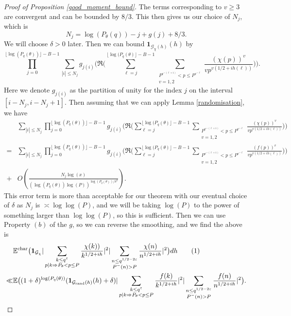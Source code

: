 \documentclass[10pt,a4paper]{amsart}
\numberwithin{equation}{section}
\newcommand\numberthis{\addtocounter{equation}{1}\tag{\theequation}}
\begin{document}
\begin{proof}[Proof of Proposition \ref{good_moment_bound}]
The terms corresponding to $v \geq 3$ are convergent and can be bounded by $8/3$. This then gives us our choice of $N_j$, which is
$$N_j = \log(P_\theta(q))-j+g(j)+8/3.$$
We will choose $\delta>0$ later. Then we can bound $\mathbf{1}_{\mathcal{G}_\chi(h)}(h)$ by
$$\prod_{j=0}^{\lfloor\log(P_q(\theta))\rfloor-B-1}\sum_{|i| \leq N_j}g_{j(i)}\big(\Re\big(\sum_{\ell=j}^{\lfloor\log(P_q(\theta)\rfloor - B -1}\sum_{\substack{P^{e^{-(\ell+1)}} < p \leq P^{e^{-\ell}} \\ v=1,2}}\frac{(\chi(p))^v}{vp^{v(1/2+ih(\ell))}}\big)\big).$$
Here we denote $g_{j(i)}$ as the partition of unity for the index $j$ on the interval $[i-N_j,i-N_j+1]$. Then assuming that we can apply Lemma \ref{randomisation}, we have
\begin{align*}
    &\sum_{|i| \leq N_j}\prod_{j=0}^{\lfloor\log(P_q(\theta))\rfloor-B-1}g_{j(i)}\big(\Re\big(\sum_{\ell=j}^{\lfloor\log(P_q(\theta)\rfloor - B -1}\sum_{\substack{P^{e^{-(\ell+1)}} < p \leq P^{e^{-\ell}} \\ v=1,2}}\frac{(\chi(p))^v}{vp^{v(1/2+ih(\ell))}}\big)\big) \\
    =& \sum_{|i| \leq N_j}\prod_{j=0}^{\lfloor\log(P_q(\theta))\rfloor-B-1}g_{j(i)}\big(\Re\big(\sum_{\ell=j}^{\lfloor\log(P_q(\theta)\rfloor - B -1}\sum_{\substack{P^{e^{-(\ell+1)}} < p \leq P^{e^{-\ell}} \\ v=1,2}}\frac{(f(p))^v}{vp^{v(1/2+ih(\ell))}}\big)\big)\\+&O(\frac{N_j\log(x)}{(\log(P_q(\theta))\log(P))^{\log(P_q(\theta))/\delta^2}}).
\end{align*}
This error term is more than acceptable for our theorem with our eventual choice of $\delta$ as $N_j$ is $\asymp \log\log(P)$, and we will be taking $\log(P)$ to the power of something larger than $\log\log(P)$, so this is sufficient. Then we can use Property $(b)$ of the $g$, so we can reverse the smoothing, and we find the above is
\begin{align*}
    &\mathbb{E}^{\text{char}}\big(\mathbf{1}_{\mathcal{G}_\chi}|\sum_{\substack{k \leq q^\varepsilon \\ p|k \Rightarrow P_\theta < p \leq P}}\frac{\chi(k))}{k^{1/2+ih}}|^2|\sum_{\substack{n \leq q^{1/2-2\varepsilon} \\ P^{-}(n) > P}}\frac{\chi(n)}{n^{1/2+ih}}|^2\big)dh \numberthis \label{randomed}\\ \ll& \mathbb{E}\big((1+\delta)^{\log(P_q(\theta))}(\mathbf{1}_{\mathcal{G}_{\text{rand}}(h)}(h)+\delta)|\sum_{\substack{k \leq q^\varepsilon \\ p|k \Rightarrow P_\theta < p \leq P}}\frac{f(k)}{k^{1/2+ih}}|^2|\sum_{\substack{n \leq q^{1/2-2\varepsilon} \\ P^{-}(n) > P}}\frac{f(n)}{n^{1/2+ih}}|^2\big).

\end{align*}
\end{proof}
\end{document}
